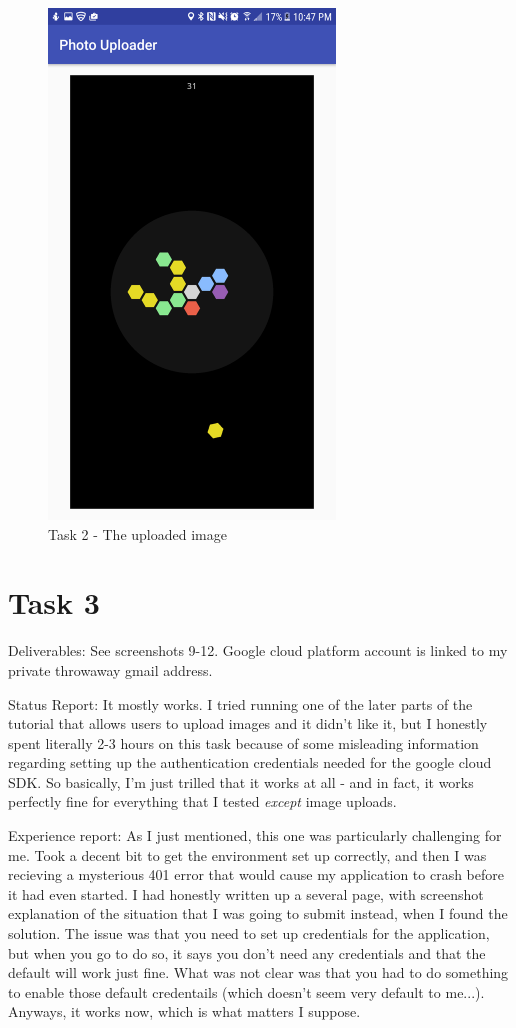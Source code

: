 \documentclass{article}
\begin{document}
	\begin{figure}[ht]
		\includegraphics[width=3in]{img/t2s4.png}
		\centering
		\caption{Task 2 - The uploaded image}
	\end{figure}


\section{Task 3}
Deliverables: See screenshots 9-12. Google cloud platform account is linked to my private throwaway gmail address.

Status Report: It mostly works. I tried running one of the later parts of the tutorial that allows users to upload images and it didn't like it, but I honestly spent literally 2-3 hours on this task because of some misleading information regarding setting up the authentication credentials needed for the google cloud SDK. So basically, I'm just trilled that it works at all - and in fact, it works perfectly fine for everything that I tested \textit{except} image uploads.

Experience report: As I just mentioned, this one was particularly challenging for me.
Took a decent bit to get the environment set up correctly, and then I was recieving a mysterious 401 error that would cause my application to crash before it had even started.
I had honestly written up a several page, with screenshot explanation of the situation that I was going to submit instead, when I found the solution.
The issue was that you need to set up credentials for the application, but when you go to do so, it says you don't need any credentials and that the default will work just fine.
What was not clear was that you had to do something to enable those default credentails (which doesn't seem very default to me...).
Anyways, it works now, which is what matters I suppose.
\end{document}
